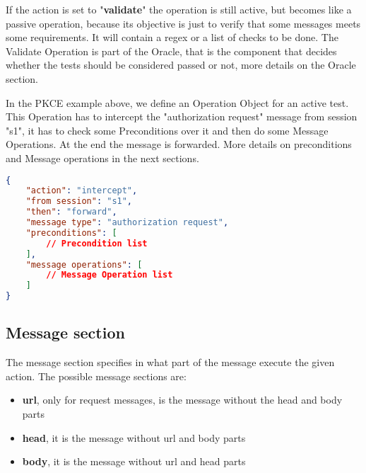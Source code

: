 If the action is set to "\textbf{validate}" the operation is still active, but becomes like a passive operation, because its objective is just to verify that some messages meets some requirements. It will contain a regex or a list of checks to be done. The Validate Operation is part of the Oracle, that is the component that decides whether the tests should be considered passed or not, more details on the Oracle section.

In the PKCE example above, we define an Operation Object for an active test. This Operation has to intercept the "authorization request" message from session "s1", it has to check some Preconditions over it and then do some Message Operations. At the end the message is forwarded. More details on preconditions and Message operations in the next sections.

\begin{lstlisting}[language=json, caption=Operation definition]
{
    "action": "intercept",
    "from session": "s1",
    "then": "forward",
    "message type": "authorization request",
    "preconditions": [
        // Precondition list
    ],
    "message operations": [
        // Message Operation list
    ]
}
\end{lstlisting}

\subsection{Message section}
The message section specifies in what part of the message execute the given action. The possible message sections are:
\begin{itemize}
    \item \textbf{url}, only for request messages, is the message without the head and body parts
    \item \textbf{head}, it is the message without url and body parts
    \item \textbf{body}, it is the message without url and head parts
\end{itemize}

